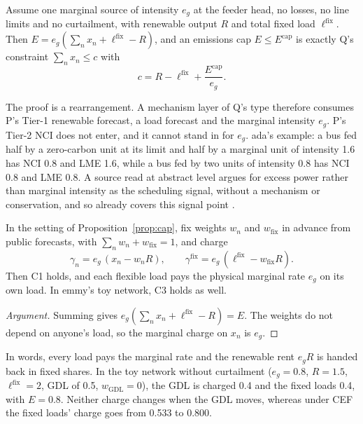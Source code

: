 \documentclass{article}
\begin{document}
\begin{proposition}\label{prop:cap}
Assume one marginal source of intensity \(e_g\) at the feeder head, no losses, no line limits and no curtailment, with renewable output \(R\) and total fixed load \(\ell^{\mathrm{fix}}\).
Then \(E=e_g(\sum_nx_n+\ell^{\mathrm{fix}}-R)\), and an emissions cap \(E\le E^{\mathrm{cap}}\) is exactly Q's constraint \(\sum_nx_n\le c\) with
\[
c=R-\ell^{\mathrm{fix}}+\frac{E^{\mathrm{cap}}}{e_g}.
\]
\end{proposition}

The proof is a rearrangement.
A mechanism layer of Q's type therefore consumes P's Tier-1 renewable forecast, a load forecast and the marginal intensity \(e_g\).
P's Tier-2 NCI does not enter, and it cannot stand in for \(e_g\).
ada's example: a bus fed half by a zero-carbon unit at its limit and half by a marginal unit of intensity 1.6 has NCI 0.8 and LME 1.6, while a bus fed by two units of intensity 0.8 has NCI 0.8 and LME 0.8.
A source read at abstract level argues for excess power rather than marginal intensity as the scheduling signal, without a mechanism or conservation, and so already covers this signal point \cite{arxiv250711377}.

\begin{proposition}\label{prop:charge}
In the setting of Proposition~\ref{prop:cap}, fix weights \(w_n\) and \(w_{\mathrm{fix}}\) in advance from public forecasts, with \(\sum_nw_n+w_{\mathrm{fix}}=1\), and charge
\[
\gamma_n=e_g\,(x_n-w_nR),\qquad \gamma^{\mathrm{fix}}=e_g\,(\ell^{\mathrm{fix}}-w_{\mathrm{fix}}R).
\]
Then C1 holds, and each flexible load pays the physical marginal rate \(e_g\) on its own load.
In emmy's toy network, C3 holds as well.
\end{proposition}

\begin{proof}[Argument]
Summing gives \(e_g(\sum_nx_n+\ell^{\mathrm{fix}}-R)=E\).
The weights do not depend on anyone's load, so the marginal charge on \(x_n\) is \(e_g\).
\end{proof}

In words, every load pays the marginal rate and the renewable rent \(e_gR\) is handed back in fixed shares.
In the toy network without curtailment (\(e_g=0.8\), \(R=1.5\), \(\ell^{\mathrm{fix}}=2\), GDL of 0.5, \(w_{\mathrm{GDL}}=0\)), the GDL is charged 0.4 and the fixed loads 0.4, with \(E=0.8\).
Neither charge changes when the GDL moves, whereas under CEF the fixed loads' charge goes from 0.533 to 0.800.
\end{document}
